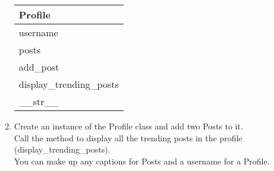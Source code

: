 \begin{enumerate}
			\begin{flushright}
			\begin{tabular}{|l|}
				\hline
				Profile\\ \hline  	%
				username\\ posts\\ \hline		%
				add\_post\\ display\_trending\_posts \\ \_\_str\_\_ \\ \hline		%
			\end{tabular}
			\end{flushright}

		\item
			Create an instance of the Profile class and add two Posts to it.\\
			Call the method to display all the trending posts in the profile (display\_trending\_posts).\\
			You can make up any captions for Posts and a username for a Profile.\\
	\end{enumerate}
\pagebreak


